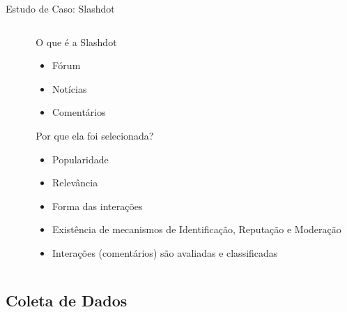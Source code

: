 \documentclass[compress]{beamer}
\begin{document}
    \begin{frame}{Estudo de Caso: Slashdot} %
        \begin{columns}
        \begin{column}{0.5\textwidth}
        \end{column}

        \begin{column}{0.5\textwidth}
            O que é a Slashdot \pause
            \begin{itemize}[<alert@+|+->]
                \item Fórum
                \item Notícias
                \item Comentários
            \end{itemize}
            \pause

            Por que ela foi selecionada? \pause
            \begin{itemize}
                \item Popularidade

                \item Relevância

                \item Forma das interações

                \item Existência de mecanismos de Identificação, Reputação e
                Moderação
                \item Interações (comentários) são avaliadas e classificadas
            \end{itemize}
        \end{column}
        \end{columns}
    \end{frame}

\subsection{Coleta de Dados}
\end{document}
